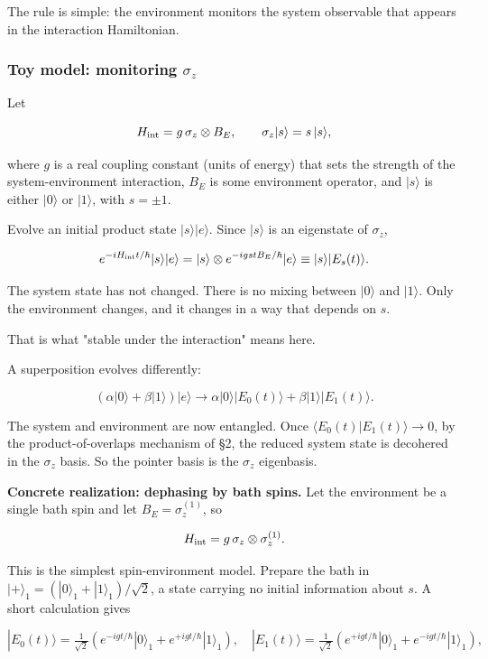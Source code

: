 \documentclass[11pt,a4paper]{article}
\begin{document}
The rule is simple: the environment monitors the system observable that appears in the interaction Hamiltonian.

\subsubsection{Toy model: monitoring $\sigma_z$}

Let

\[
H_{\rm int} = g\,\sigma_z \otimes B_E, \qquad \sigma_z |s\rangle = s\,|s\rangle,
\]

where $g$ is a real coupling constant (units of energy) that sets the strength of the system-environment interaction, $B_E$ is some environment operator, and $|s\rangle$ is either $|0\rangle$ or $|1\rangle$, with $s = \pm 1$.

Evolve an initial product state $|s\rangle|e\rangle$. Since $|s\rangle$ is an eigenstate of $\sigma_z$,

\[
e^{-i H_{\rm int} t / \hbar} |s\rangle|e\rangle
= |s\rangle \otimes e^{-i g s t B_E / \hbar} |e\rangle
\equiv |s\rangle |E_s(t)\rangle.
\]

The system state has not changed. There is no mixing between $|0\rangle$ and $|1\rangle$. Only the environment changes, and it changes in a way that depends on $s$.

That is what "stable under the interaction" means here.

A superposition evolves differently:

\[
(\alpha|0\rangle + \beta|1\rangle)|e\rangle
\longrightarrow
\alpha|0\rangle|E_0(t)\rangle + \beta|1\rangle|E_1(t)\rangle.
\]

The system and environment are now entangled. Once $\langle E_0(t) | E_1(t)\rangle \to 0$, by the product-of-overlaps mechanism of §2, the reduced system state is decohered in the $\sigma_z$ basis. So the pointer basis is the $\sigma_z$ eigenbasis.

\textbf{Concrete realization: dephasing by bath spins.} Let the environment be a single bath spin and let $B_E = \sigma_z^{(1)}$, so

\[
H_{\rm int} = g\,\sigma_z \otimes \sigma_z^{(1)}.
\]

This is the simplest spin-environment model. Prepare the bath in $|+\rangle_1 = (|0\rangle_1 + |1\rangle_1)/\sqrt{2}$, a state carrying no initial information about $s$. A short calculation gives

\[
|E_0(t)\rangle = \tfrac{1}{\sqrt{2}}\!\left(e^{-igt/\hbar}|0\rangle_1 + e^{+igt/\hbar}|1\rangle_1\right), \quad
|E_1(t)\rangle = \tfrac{1}{\sqrt{2}}\!\left(e^{+igt/\hbar}|0\rangle_1 + e^{-igt/\hbar}|1\rangle_1\right),
\]
\end{document}
